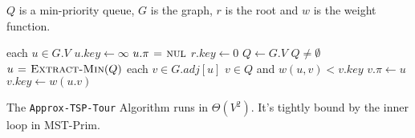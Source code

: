 $Q$ is a min-priority queue, $G$ is the graph, $r$ is the root and $w$ is the
weight function.
\begin{codebox}
\li \For each $u \in G.V$ \Do
\li   $u.key \gets \infty$
\li   $u.\pi \mathrel{\hspace{1pt}=\hspace{1pt}} \textnormal{\scshape nul}$ \End
\li $r.key \gets 0$
\li $Q \gets G.V$
\li \While $Q \neq \emptyset$ \Do
\li   $u \mathrel{\hspace{1pt}=\hspace{1pt}} \textnormal{\scshape Extract-Min}(Q)$
\li   \For each $v \in G.adj[u]$ \Do
\li     \If $v \in Q$ and $w(u,v) < v.key$ \Do
\li       $v.\pi \gets u$
\li       $v.key \gets w(u.v)$
\end{codebox}

The \texttt{Approx-TSP-Tour} Algorithm runs in $\Theta(V^2)$. It's tightly bound by the inner loop
in MST-Prim.


